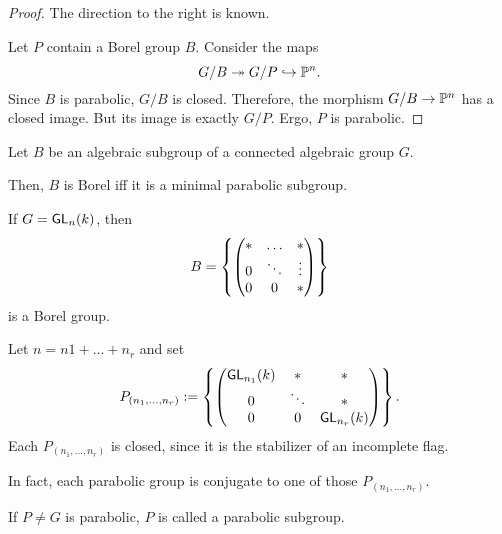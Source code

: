 \begin{proof}
	The direction to the right is known.
	
	Let $P$ contain a Borel group $B$. Consider the maps
	\[ G / B \overset{}{\twoheadrightarrow} G /P \overset{}{\hookrightarrow} \mathbb{P}^n. \]
	Since $B$ is parabolic, $G/B$ is closed. Therefore, the morphism $G / B \overset{}{\rightarrow} \mathbb{P}^n$ has a closed image. But its image is exactly $G/P$. Ergo, $P$ is parabolic.
\end{proof}
\begin{corollary}
	Let $B$ be an algebraic subgroup of a connected algebraic group $G$.
	
	Then, $B$ is Borel iff it is a minimal parabolic subgroup.
\end{corollary}

\begin{example}
	If $G  = \textsf{GL}_n(k)$, then
	\[ B = \left\lbrace\left(\begin{matrix} * & \ldots & * \\
	0 & \ddots & \vdots\\
 0  & 0 & *  \end{matrix}\right)\right\rbrace \]
is a Borel group.


Let $n = n1 + \ldots + n_r$ and set
\[ P_{(n_1,\ldots, n_r)} := 
\left\lbrace
\left(\begin{matrix} \textsf{GL}_{n_1}(k) & * & * \\
	0 & \ddots & *\\
	0  & 0 & \textsf{GL}_{n_r}(k)  \end{matrix}\right)
\right\rbrace.
 \]
 Each $P_{(n_1,\ldots, n_r)}$ is closed, since it is the stabilizer of an incomplete flag.
 
 In fact, each parabolic group is conjugate to one of those $P_{(n_1,\ldots, n_r)}$.
 
 If $P \neq G$ is parabolic, $P$ is called a  parabolic subgroup.
\end{example}

